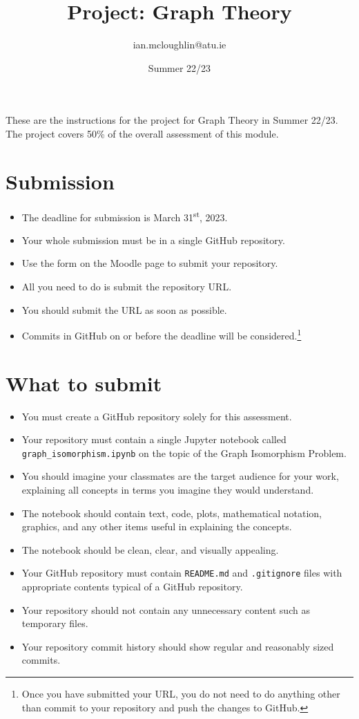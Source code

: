 \documentclass{iansnotes}
\title{Project: Graph Theory}
\author{ian.mcloughlin@atu.ie}
\date{Summer 22/23}
\begin{document}
 
\maketitle

These are the instructions for the project for Graph Theory in Summer 22/23.
The project covers 50\% of the overall assessment of this module.


\section{Submission}

\begin{itemize}
  \item The deadline for submission is March 31\textsuperscript{st}, 2023. 
  \item Your whole submission must be in a single GitHub repository.
  \item Use the form on the Moodle page to submit your repository.
  \item All you need to do is submit the repository URL.
  \item You should submit the URL as soon as possible.
  \item Commits in GitHub on or before the deadline will be considered.\footnote{Once you have submitted your URL, you do not need to do anything other than commit to your repository and push the changes to GitHub.}
\end{itemize}


\section{What to submit}

\begin{itemize}
  \item You must create a GitHub repository solely for this assessment.
  \item Your repository must contain a single Jupyter notebook called \texttt{graph\_isomorphism.ipynb} on the topic of the Graph Isomorphism Problem.
  \item You should imagine your classmates are the target audience for your work, explaining all concepts in terms you imagine they would understand.
  \item The notebook should contain text, code, plots, mathematical notation, graphics, and any other items useful in explaining the concepts.
  \item The notebook should be clean, clear, and visually appealing.
  \item Your GitHub repository must contain \texttt{README.md} and \texttt{.gitignore} files with appropriate contents typical of a GitHub repository.
  \item Your repository should not contain any unnecessary content such as temporary files.
  \item Your repository commit history should show regular and reasonably sized commits.
\end{itemize}
\end{document}
